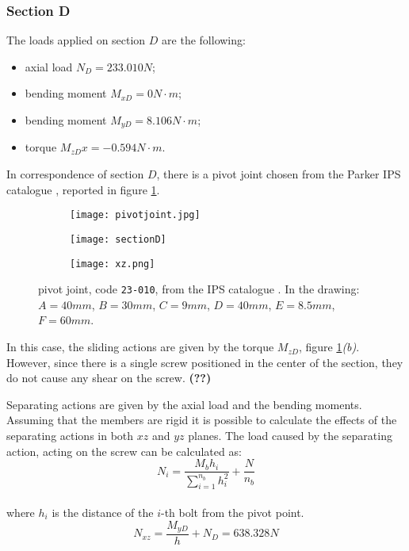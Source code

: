 \subsubsection*{Section D}
The loads applied on section $D$ are the following:
\begin{itemize}
	\item axial load $N_{D} = 233.010 N$;
	\item bending moment $M_{xD} = 0 N\cdot m$; 
	\item bending moment $M_{yD} = 8.106 N\cdot m$; 
	\item torque $M_{zD}x = -0.594 N\cdot m$.
\end{itemize}
In correspondence of section $D$, there is a pivot joint chosen from the Parker IPS catalogue \cite{parker-ds}, reported in figure \ref{fig:pivot}.
\begin{figure}[h!]
    \centering
    \begin{subfigure}{0.32\linewidth}
    	\centering \texttt{[image: pivotjoint.jpg]} \caption{}
    \end{subfigure}
	\begin{subfigure}{0.32\linewidth}
		\centering \texttt{[image: sectionD]} \caption{}
	\end{subfigure}
	\begin{subfigure}{0.32\linewidth}
		\centering \texttt{[image: xz.png]} \caption{}
	\end{subfigure}    
    \caption{pivot joint, code \texttt{23-010}, from the IPS catalogue \cite{parker-ds}. In the drawing: $A = 40mm$, $B=30mm$, $C=9mm$, $D=40mm$, $E=8.5mm$, $F=60mm$.}
    \label{fig:pivot}
\end{figure}

In this case, the sliding actions are given by the torque $M_{zD}$,  figure \ref{fig:pivot}\textit{(b)}. However, since there is a single screw positioned in the center of the section, they do not cause any shear on the screw. \textbf{(??)}

Separating actions are given by the axial load and the bending moments. Assuming that the members are rigid it is possible to calculate the effects of the separating actions in both $xz$ and $yz$ planes. The load caused by the separating action, acting on the screw can be calculated as:
\begin{equation*}
    N_{i} = \frac{M_{b}h_{i}}{\sum\limits_{i=1}^{n_{b}} h^2_{i}} + \frac{N}{n_{b}}
\end{equation*}\\
where $h_{i}$ is the distance of the $i$-th bolt from the pivot point.
\begin{equation*}
    N_{xz} = \frac{M_{yD}}{h} + N_{D} = 638.328 N
\end{equation*}


